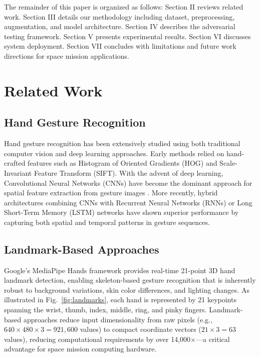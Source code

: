 \documentclass[conference]{IEEEtran}
\begin{document}
The remainder of this paper is organized as follows: Section II reviews related work. Section III details our methodology including dataset, preprocessing, augmentation, and model architecture. Section IV describes the adversarial testing framework. Section V presents experimental results. Section VI discusses system deployment. Section VII concludes with limitations and future work directions for space mission applications.

\section{Related Work}

\subsection{Hand Gesture Recognition}
Hand gesture recognition has been extensively studied using both traditional computer vision and deep learning approaches. Early methods relied on hand-crafted features such as Histogram of Oriented Gradients (HOG) \cite{ref_hog} and Scale-Invariant Feature Transform (SIFT). With the advent of deep learning, Convolutional Neural Networks (CNNs) have become the dominant approach for spatial feature extraction from gesture images \cite{ref_cnn_gesture}. More recently, hybrid architectures combining CNNs with Recurrent Neural Networks (RNNs) or Long Short-Term Memory (LSTM) networks have shown superior performance by capturing both spatial and temporal patterns in gesture sequences.

\subsection{Landmark-Based Approaches}
Google's MediaPipe Hands framework \cite{ref_mediapipe} provides real-time 21-point 3D hand landmark detection, enabling skeleton-based gesture recognition that is inherently robust to background variations, skin color differences, and lighting changes. As illustrated in Fig.~\ref{fig:landmarks}, each hand is represented by 21 keypoints spanning the wrist, thumb, index, middle, ring, and pinky fingers. Landmark-based approaches reduce input dimensionality from raw pixels (e.g., $640 \times 480 \times 3 = 921,600$ values) to compact coordinate vectors ($21 \times 3 = 63$ values), reducing computational requirements by over 14,000$\times$—a critical advantage for space mission computing hardware.
\end{document}
